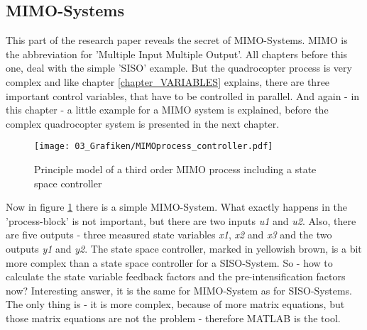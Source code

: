 \subsection{MIMO-Systems}\label{chapter_MIMO}

This part of the research paper reveals the secret of MIMO-Systems. MIMO is the abbreviation for 'Multiple Input Multiple Output'. All chapters before this one, deal with the simple 'SISO' example. But the quadrocopter process is very complex and like chapter \ref{chapter_VARIABLES} explains, there are three important control variables, that have to be controlled in parallel. And again - in this chapter - a little example for a MIMO system is explained, before the complex quadrocopter system is presented in the next chapter.

\begin{figure}
	\centering
		\texttt{[image: 03\_Grafiken/MIMOprocess\_controller.pdf]}
	\caption{Principle model of a third order MIMO process including a state space controller}
	\label{fig:MIMOprocess_controller}
\end{figure}

Now in figure \ref{fig:MIMOprocess_controller} there is a simple MIMO-System. What exactly happens in the 'process-block' is not important, but there are two inputs \textit{u1} and \textit{u2}. Also, there are five outputs - three measured state variables \textit{x1}, \textit{x2} and \textit{x3} and the two outputs \textit{y1} and \textit{y2}. The state space controller, marked in yellowish brown, is a bit more complex than a state space controller for a SISO-System. So - how to calculate the state variable feedback factors and the pre-intensification factors now? Interesting answer, it is the same for MIMO-System as for SISO-Systems. The only thing is - it is more complex, because of more matrix equations, but those matrix equations are not the problem - therefore MATLAB is the tool.